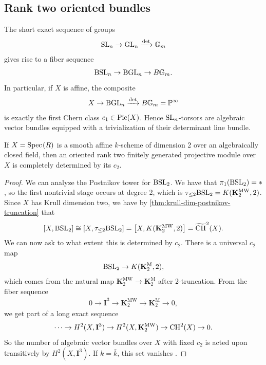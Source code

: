 \documentclass[11pt,openany]{book}
\providecommand{\KM}{\mathbf{K}^\mathrm{M}}
\providecommand{\KMW}{\mathbf{K}^\mathrm{MW}}
\providecommand{\CHW}{\widetilde{\mathrm{CH}}}
\begin{document}
\subsection{Rank two oriented bundles}

The short exact sequence of groups
\begin{align*}
    \mathrm{SL}_n \to \mathrm{GL}_n \xrightarrow{\det} \mathbb{G}_m
\end{align*}
gives rise to a fiber sequence
\begin{align*}
    \mathrm{BSL}_n \to \mathrm{BGL}_n \to B \mathbb{G}_m.
\end{align*}
In particular, if $X$ is affine, the composite
\begin{align*}
    X \to \mathrm{BGL}_n \xrightarrow{\det} B \mathbb{G}_m = \mathbb{P}^\infty
\end{align*}
is exactly the first Chern class $c_1 \in \mathrm{Pic}(X)$. Hence $\mathrm{SL}_n$-torsors are algebraic vector bundles equipped with a trivialization of their determinant line bundle.

\begin{theorem}
If $X = \text{Spec}\hspace{0.1em}(R)$ is a smooth affine $k$-scheme of dimension 2 over an algebraically closed field, then an oriented rank two finitely generated projective module over $X$ is completely determined by its $c_2$.
\end{theorem}
\begin{proof} We can analyze the Postnikov tower for $\mathrm{BSL}_2$. We have that $\pi_1(\mathrm{BSL}_2) = \ast$, so the first nontrivial stage occurs at degree 2, which is $\tau_{\le 2}\BSL_2 = K(\KMW_2,2)$. Since $X$ has Krull dimension two, we have by \autoref{thm:krull-dim-postnikov-truncation} that
\begin{align*}
    \left[ X,\BSL_2 \right] \cong \left[ X,\tau_{\le 2}\BSL_2 \right] = \left[ X, K(\KMW_2,2) \right] = \CHW^2(X).
\end{align*}
We can now ask to what extent this is determined by $c_2$. There is a universal $c_2$ map
\begin{align*}
    \BSL_2 \to K(\KM_2,2),
\end{align*}
which comes from the natural map $\KMW_2 \to \KM_2$ after 2-truncation. From the fiber sequence
\begin{align*}
    0 \to \mathbf{I}^3 \to \KMW_2 \to \KM_2 \to 0,
\end{align*}
we get part of a long exact sequence
\begin{align*}
    \cdots \to H^2(X,\mathbf{I}^3) \to H^2(X,\KMW_2) \to \CH^2(X) \to 0.
\end{align*}
So the number of algebraic vector bundles over $X$ with fixed $c_2$ is acted upon transitively by $H^2(X,\mathbf{I}^3)$. If $k = \bar{k}$, this set vanishes \cite[5.1]{AF3}.
\end{proof}
\end{document}
